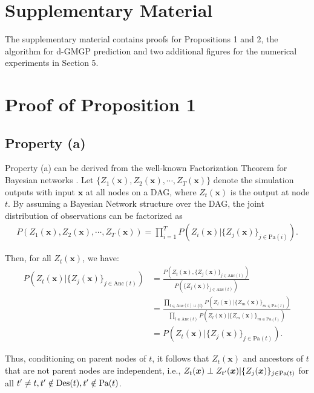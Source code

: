 \documentclass[12pt]{article}
\newcommand{\bs}[1]{\boldsymbol{#1}}
\begin{document}
\section{Supplementary Material}
The supplementary material contains proofs for Propositions 1 and 2, the algorithm for d-GMGP prediction and two additional figures for the numerical experiments in Section 5.

\section{Proof of Proposition 1}

\subsection{Property (a)}
Property (a) can be derived from the well-known Factorization Theorem for Bayesian networks \citep{russell03a}. Let $\{Z_1(\bs{x}),Z_2(\bs{x}),\cdots,Z_T(\bs{x})\}$ denote the simulation outputs with input $\bs{x}$ at all nodes on a DAG, where $Z_t(\bs{x})$ is the output at node $t$. By assuming a Bayesian Network structure over the DAG, the joint distribution of observations can be factorized as
\begin{align*}
    P(Z_1(\bs{x}),Z_2(\bs{x}),\cdots,Z_T(\bs{x})) = \prod_{i=1}^{T}P(Z_i(\bs{x})|\{Z_j(\bs{x})\}_{j\in \text{Pa}(i)}).
\end{align*}

\noindent Then, for all $Z_t(\bs{x})$, we have:
\begin{align*}
    P(Z_t(\bs{x})|\{Z_j(\bs{x})\}_{j\in \text{Anc}(t)}) &= \frac{P(Z_t(\bs{x}),\{Z_j(\bs{x})\}_{j\in \text{Anc}(t)})}{P(\{Z_j(\bs{x})\}_{j\in \text{Anc}(t)})}\\
    &= \frac{\prod_{l\in \text{Anc}(t)\cup\{t\}}P(Z_l(\bs{x})|\{Z_m(\bs{x})\}_{m\in \text{Pa}(l)})}{\prod_{l\in \text{Anc}(t)}P(Z_l(\bs{x})|\{Z_m(\bs{x})\}_{m\in \text{Pa}(l)})}\\
    &= P(Z_t(\bs{x})|\{Z_j(\bs{x})\}_{j\in \text{Pa}(t)}).
\end{align*}

\noindent Thus, conditioning on parent nodes of $t$, it follows that $Z_t(\bs{x})$ and ancestors of $t$ that are not parent nodes are independent, i.e., $Z_t(\bs{x}) \perp Z_{t'}(\bs{x}) | \{Z_j(\bs{x})\}_{j \in \textup{Pa}(t)}$ for all $t'\neq t, t' \notin \textup{Des}(t), t'\notin \textup{Pa}(t)$.
\end{document}
